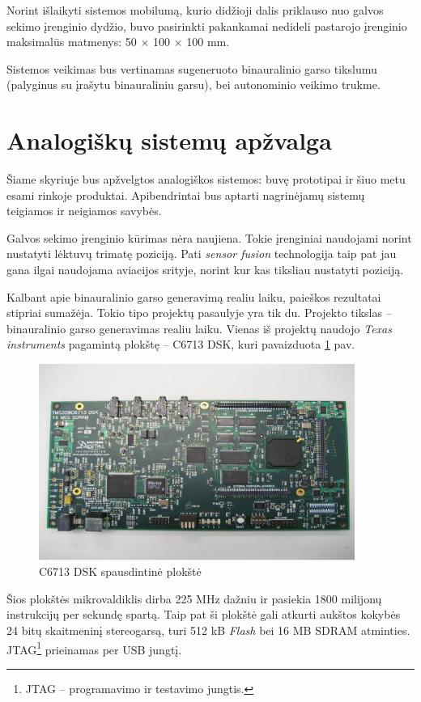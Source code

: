 \documentclass[]{vgtuef}
\begin{document}
Norint išlaikyti sistemos mobilumą, kurio didžioji dalis priklauso nuo galvos sekimo įrenginio dydžio, buvo pasirinkti pakankamai nedideli pastarojo įrenginio maksimalūs matmenys: 50 $\times$ 100 $\times$ 100 mm.

Sistemos veikimas bus vertinamas sugeneruoto binauralinio garso tikslumu (palyginus su įrašytu binauraliniu garsu), bei autonominio veikimo trukme.


\section{Analogiškų sistemų apžvalga}

Šiame skyriuje bus apžvelgtos analogiškos sistemos: buvę prototipai ir šiuo metu esami rinkoje produktai. Apibendrintai bus aptarti nagrinėjamų sistemų teigiamos ir neigiamos savybės. 


Galvos sekimo įrenginio kūrimas nėra naujiena. Tokie įrenginiai naudojami norint nustatyti lėktuvų  trimatę poziciją. Pati \textit{sensor fusion} technologija taip pat jau gana ilgai naudojama aviacijos srityje, norint kur kas tiksliau nustatyti poziciją.

Kalbant apie binauralinio garso generavimą realiu laiku, paieškos rezultatai stipriai sumažėja. Tokio tipo projektų pasaulyje yra tik du. Projekto tikslas – binauralinio garso generavimas realiu laiku. Vienas iš projektų naudojo \textit{Texas instruments} pagamintą plokštę -- C6713 DSK, kuri pavaizduota \ref{fig:C6713_dsk_board} pav.

\begin{figure}[!ht]
  \centering
  \includegraphics[width=390px]{img/c6713.jpg}
  \caption{C6713 DSK spausdintinė plokštė}
  \label{fig:C6713_dsk_board}
\end{figure}

Šios plokštės mikrovaldiklis dirba 225 MHz dažniu ir pasiekia 1800 milijonų instrukcijų per sekundę spartą. Taip pat ši plokštė gali atkurti aukštos kokybės 24 bitų skaitmeninį stereogarsą, turi 512 kB \textit{Flash} bei 16 MB SDRAM atminties. JTAG\footnote{  JTAG -- programavimo ir testavimo jungtis.} prieinamas per USB jungtį.
\end{document}
